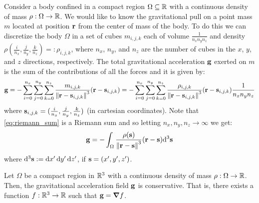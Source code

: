 \documentclass[../main.tex]{subfiles}
\begin{document}
Consider a body confined in a compact region $\Omega\subseteq\mathbb{R}$ with a continuous density of mass $\rho:\Omega\to\mathbb{R}$. We would like to know the gravitational pull on a point mass $m$ located at position $\boldsymbol{\mathrm{r}}$ from the center of mass of the body. To do this we can discretize the body $\Omega$ in a set of cubes $m_{i,j,k}$ each of volume $\frac{1}{n_xn_yn_z}$ and density $\rho(\frac{i}{n_x},\frac{j}{n_y},\frac{k}{n_z})=:\rho_{i,j,k}$, where $n_x$, $n_y$, and $n_z$ are the number of cubes in the $x$, $y$, and $z$ directions, respectively. The total gravitational acceleration $\boldsymbol{\mathrm{g}}$ exerted on $m$ is the sum of the contributions of all the forces and it is given by:
\begin{equation}\label{eq:riemann_sum}
  \boldsymbol{\mathrm{g}}=-\sum_{i=0}^{n_x}\sum_{j=0}^{n_y}\sum_{k=0}^{n_z}\frac{m_{i,j,k}}{\left\|\boldsymbol{\mathrm{r}}-\boldsymbol{\mathrm{s}}_{i,j,k}\right\|^3}(\boldsymbol{\mathrm{r}}-\boldsymbol{\mathrm{s}}_{i,j,k})=-\sum_{i=0}^{n_x}\sum_{j=0}^{n_y}\sum_{k=0}^{n_z}\frac{\rho_{i,j,k}}{\left\|\boldsymbol{\mathrm{r}}-\boldsymbol{\mathrm{s}}_{i,j,k}\right\|^3}(\boldsymbol{\mathrm{r}}-\boldsymbol{\mathrm{s}}_{i,j,k})\frac{1}{n_xn_yn_z}
\end{equation}
where $\boldsymbol{\mathrm{s}}_{i,j,k}=(\frac{i}{n_x},\frac{j}{n_y},\frac{k}{n_z})$ (in cartesian coordinates). Note that \cref{eq:riemann_sum} is a Riemann sum and so letting $n_x,n_y,n_z\to\infty$ we get:
\begin{equation}\label{eq:limit}
  \boldsymbol{\mathrm{g}}=-\int_{\Omega}\frac{\rho(\boldsymbol{\mathrm{s}})}{\left\|\boldsymbol{\mathrm{r}}-\boldsymbol{\mathrm{s}}\right\|^3}(\boldsymbol{\mathrm{r}}-\boldsymbol{\mathrm{s}})\dd^3{\boldsymbol{\mathrm{s}}}
\end{equation}
where $\dd^3{\boldsymbol{\mathrm{s}}}:=\dd{x'}\dd{y'}\dd{z'}$, if $\boldsymbol{\mathrm{s}}=(x',y',z')$.
\begin{theorem}\label{thm:conservative}
  Let $\Omega$ be a compact region in $\mathbb{R}^3$ with a continuous density of mass $\rho:\Omega\to\mathbb{R}$. Then, the gravitational acceleration field $\boldsymbol{\mathrm{g}}$ is conservative. That is, there exists a function $f:\mathbb{R}^3\rightarrow\mathbb{R}$ such that $\boldsymbol{\mathrm{g}}=\grad f$.
\end{theorem}
\end{document}
